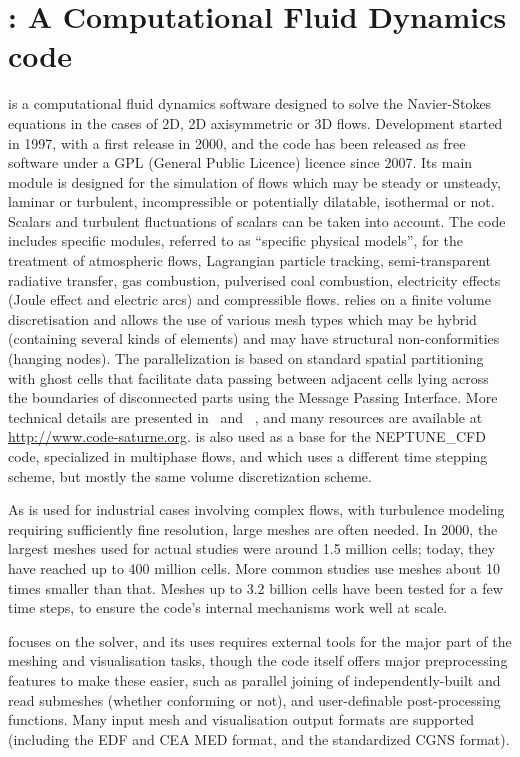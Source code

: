 \section{\CS: A Computational Fluid Dynamics code}
\label{sec:cs}
\CS is a computational fluid dynamics software designed to solve the
Navier-Stokes equations in the cases of 2D, 2D axisymmetric or 3D
flows. Development started in 1997, with a first release in 2000, and the
code has been released as free software under a GPL (General Public Licence) licence since 2007.
Its main module is designed for the simulation of flows which may be
steady or unsteady, laminar or turbulent, incompressible or potentially
dilatable, isothermal or not. Scalars and turbulent fluctuations of scalars can
be taken into account. The code includes specific modules, referred to as
``specific physical models'', for the treatment of atmospheric flows, Lagrangian particle
tracking, semi-transparent radiative transfer, gas combustion, pulverised coal
combustion, electricity effects (Joule effect and electric arcs) and
compressible flows. \CS relies on a finite volume discretisation and
allows the use of various mesh types which may be hybrid (containing several
kinds of elements) and may have structural non-conformities (hanging nodes). The
parallelization is based on standard spatial partitioning with ghost cells
that facilitate data passing between adjacent cells lying across the boundaries
of disconnected parts using the Message Passing Interface. More
technical details are presented in~\cite{cs2004} and ~\cite{userguide},
and many resources are available at \url{http://www.code-saturne.org}.
\CS is also used as a base for the NEPTUNE\_CFD code, specialized in
multiphase flows, and which uses a different time stepping scheme,
but mostly the same volume discretization scheme.

As \CS is used for industrial cases involving complex flows, with turbulence
modeling requiring sufficiently fine resolution, large meshes are often
needed. In 2000, the largest meshes used for actual studies were around
1.5 million cells; today, they have reached up to 400 million cells.
More common studies use meshes about 10 times smaller than that.
Meshes up to 3.2 billion cells have been tested for a few time steps, to
ensure the code's internal mechanisms work well at scale.

\CS focuses on the solver, and its uses requires external tools for the
major part of the meshing and visualisation tasks, though the code itself offers
major preprocessing features to make these easier, such as parallel joining
of independently-built and read submeshes (whether conforming or not),
and user-definable post-processing functions. Many input mesh and visualisation
output formats are supported (including the EDF and CEA MED format,
and the standardized CGNS format).

